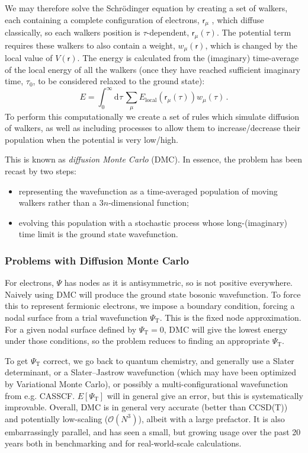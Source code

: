 \documentclass{article}
\theoremstyle{plain}\theoremheaderfont{\normalfont\itshape}\theorembodyfont{\rmfamily}\theoremseparator{.}\newtheorem*{rem}{Remark}\newtheorem*{ex}{Example}\newtheorem*{proof}{Proof}\newtheorem*{altp}{Alternative proof}
\theoremstyle{plain}\theoremheaderfont{\normalfont\bfseries}\theorembodyfont{\rmfamily}\theoremseparator{.}\newtheorem{thm}{Theorem}[section]\newtheorem{lem}[thm]{Lemma}\newtheorem{prop}[thm]{Proposition}\newtheorem*{cor}{Corollary}\newtheorem{defn}[thm]{Definition}\newtheorem{clm}[thm]{Claim}\newtheorem{clminproof}{Claim}
\theoremstyle{break}\theoremheaderfont{\normalfont\itshape}\theorembodyfont{\rmfamily}\theoremseparator{.\medskip}\newtheorem*{proofskip}{Proof}\newtheorem*{exs}{Examples}\newtheorem*{rems}{Remarks}
\theoremstyle{break}\theoremheaderfont{\normalfont\bfseries}\theorembodyfont{\rmfamily}\theoremseparator{.\medskip}\newtheorem{lemskip}[thm]{Lemma}\newtheorem{defnskip}[thm]{Definition}\newtheorem{propskip}[thm]{Proposition}\newtheorem{thmskip}[thm]{Theorem}
\numberwithin{equation}{section}
\newcommand{\dd}[2][]{\mathrm{d}^{#1} #2\,}
\newcommand{\rr}{\mathsf{r}}
\begin{document}
    We may therefore solve the Schr\"{o}dinger equation by creating a set of walkers, each containing a complete configuration of electrons, \(\rr_\mu\) , which diffuse classically, so each walkers position is \(\tau\)-dependent, \(\rr_\mu(\tau)\). The potential term requires these walkers to also contain a weight, \(w_\mu(\rr)\), which is changed by the local value of \(V(\rr)\). The energy is calculated from the (imaginary) time-average of the local energy of all the walkers (once they have reached sufficient imaginary time, \(\tau_0\), to be considered relaxed to the ground state):
    \begin{equation}
        E=\int_{0}^{\infty}\dd{\tau}\sum_\mu E_{\text{local}}(\rr_\mu(\tau))w_\mu(\tau)\,.
    \end{equation}
    To perform this computationally we create a set of rules which simulate diffusion of walkers, as well as including processes to allow them to increase/decrease their population when the potential is very low/high.

    This is known as \textit{diffusion Monte Carlo} (DMC). In essence, the problem has been recast by two steps:
    \begin{itemize}[topsep=0pt]
        \item representing the wavefunction as a time-averaged population of moving walkers rather than a \(3n\)-dimensional function;
        \item evolving this population with a stochastic process whose long-(imaginary) time limit is the ground state wavefunction.
    \end{itemize}
    \subsubsection{Problems with Diffusion Monte Carlo}
    For electrons, \(\Psi\) has nodes as it is antisymmetric, so is not positive everywhere. Naively using DMC will produce the ground state bosonic wavefunction. To force this to represent fermionic electrons, we impose a boundary condition, forcing a nodal surface from a trial wavefunction \(\Psi_{\text{T}}\). This is the fixed node approximation. For a given nodal surface defined by \(\Psi_{\text{T}}=0\), DMC will give the lowest energy under those conditions, so the problem reduces to finding an appropriate \(\Psi_{\text{T}}\).

    To get \(\Psi_{\text{T}}\) correct, we go back to quantum chemistry, and generally use a Slater determinant, or a Slater--Jastrow wavefunction (which may have been optimized by Variational Monte Carlo), or possibly a multi-configurational wavefunction from e.g. CASSCF. \(E[\Psi_{\text{T}}]\) will in general give an error, but this is systematically improvable. Overall, DMC is in general very accurate (better than CCSD(T)) and potentially low-scaling (\(\mathcal{O}(N^3)\)), albeit with a large prefactor. It is also embarrassingly parallel, and has seen a small, but growing usage over the past 20 years both in benchmarking and for real-world-scale calculations.
\end{document}
